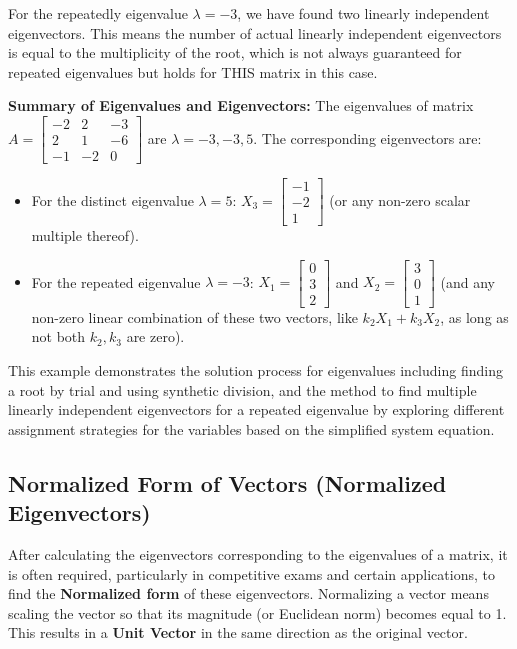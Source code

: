 \documentclass{article}
\begin{document}
For the repeatedly eigenvalue $\lambda = -3$, we have found two linearly independent eigenvectors. This means the number of actual linearly independent eigenvectors is equal to the multiplicity of the root, which is not always guaranteed for repeated eigenvalues but holds for THIS matrix in this case.

\textbf{Summary of Eigenvalues and Eigenvectors:}
The eigenvalues of matrix $A = \begin{bmatrix} -2 & 2 & -3 \\ 2 & 1 & -6 \\ -1 & -2 & 0 \end{bmatrix}$ are $\lambda = -3, -3, 5$.
The corresponding eigenvectors are:
\begin{itemize}
    \item For the distinct eigenvalue $\lambda = 5$: $X_3 = \begin{bmatrix} -1 \\ -2 \\ 1 \end{bmatrix}$ (or any non-zero scalar multiple thereof).
    \item For the repeated eigenvalue $\lambda = -3$: $X_1 = \begin{bmatrix} 0 \\ 3 \\ 2 \end{bmatrix}$ and $X_2 = \begin{bmatrix} 3 \\ 0 \\ 1 \end{bmatrix}$ (and any non-zero linear combination of these two vectors, like $k_2 X_1 + k_3 X_2$, as long as not both $k_2, k_3$ are zero).
\end{itemize}

This example demonstrates the solution process for eigenvalues including finding a root by trial and using synthetic division, and the method to find multiple linearly independent eigenvectors for a repeated eigenvalue by exploring different assignment strategies for the variables based on the simplified system equation.


\subsection{Normalized Form of Vectors (Normalized Eigenvectors)} %

After calculating the eigenvectors corresponding to the eigenvalues of a matrix, it is often required, particularly in competitive exams and certain applications, to find the \textbf{Normalized form} of these eigenvectors. Normalizing a vector means scaling the vector so that its magnitude (or Euclidean norm) becomes equal to 1. This results in a \textbf{Unit Vector} in the same direction as the original vector.
\end{document}
